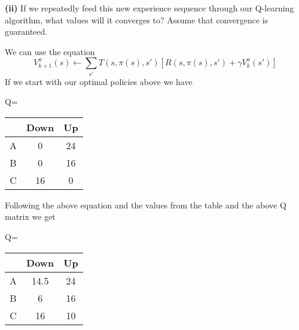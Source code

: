 \documentclass[12pt,letter]{article}
\begin{document}
\vspace{1cm}\textbf{(ii)} If we repeatedly feed this new experience sequence through our 
Q-learning algorithm, what values will it converges to? Assume that 
convergence is guaranteed.

We can use the equation
\[
    V_{k+1}^\pi(s)\gets\sum\limits_{s'}T(s,\pi(s),s')\left[R(s,\pi(s),s') + \gamma V_k^\pi(s')\right]
\]
If we start with our optimal policies above we have

\begin{center}
Q=
\begin{tabular}{c|cc}
    & Down & Up\\\hline
    A & 0 & 24 \\
    B & 0 & 16 \\
    C & 16 & 0\\
\end{tabular}
\end{center}

Following the above equation and the values from the table and the above Q 
matrix we get

\begin{center}
Q=
\begin{tabular}{c|cc}
    & Down & Up\\\hline
    A & 14.5 & 24 \\
    B & 6 & 16 \\
    C & 16 & 10\\
\end{tabular}
\end{center}
\end{document}
